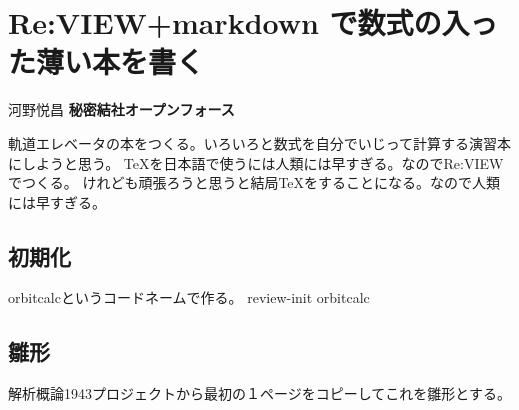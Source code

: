 \chapter{Re:VIEW+markdown で数式の入った薄い本を書く}
\label{chap:mdformula}
 \begin{center} 
河野悦昌  \textbf{秘密結社オープンフォース}

 \end{center} 
軌道エレベータの本をつくる。いろいろと数式を自分でいじって計算する演習本にしようと思う。
TeXを日本語で使うには人類には早すぎる。なのでRe:VIEWでつくる。
けれども頑張ろうと思うと結局TeXをすることになる。なので人類には早すぎる。

\section{初期化}
\label{sec:4-1}

orbitcalcというコードネームで作る。
review{-}init orbitcalc

\section{雛形}
\label{sec:4-2}

解析概論1943プロジェクトから最初の１ページをコピーしてこれを雛形とする。

